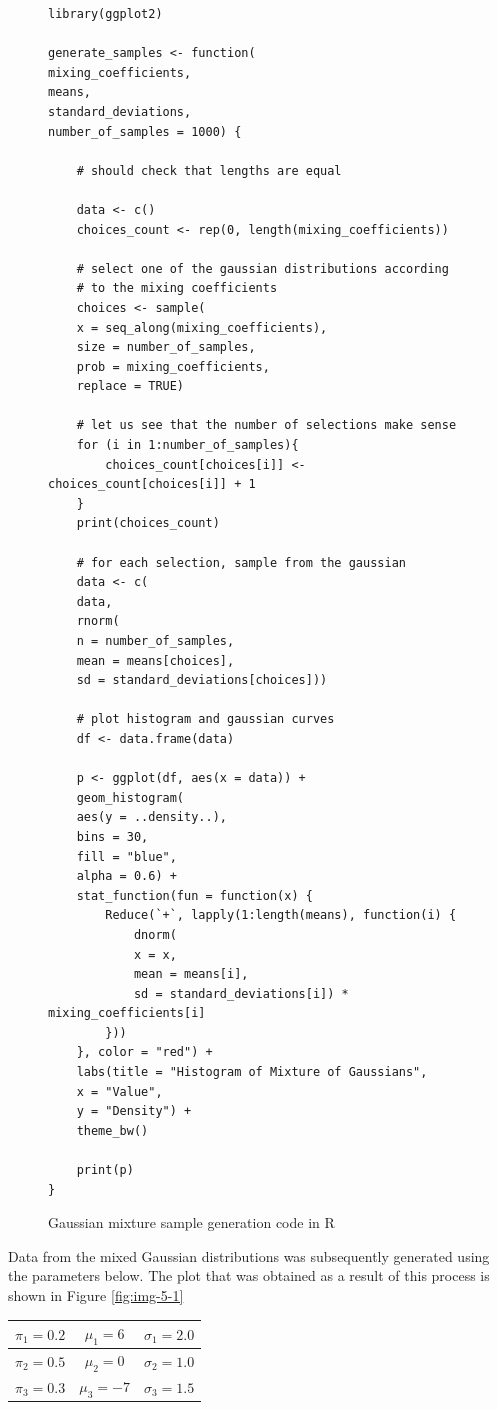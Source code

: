 \documentclass[]{article}
\begin{document}
\begin{figure}[H]
	\captionsetup{type=lstlisting}
	\begin{lstlisting}
library(ggplot2)

generate_samples <- function(
mixing_coefficients,
means,
standard_deviations,
number_of_samples = 1000) {
	
	# should check that lengths are equal
	
	data <- c()
	choices_count <- rep(0, length(mixing_coefficients))
	
	# select one of the gaussian distributions according
	# to the mixing coefficients
	choices <- sample(
	x = seq_along(mixing_coefficients),
	size = number_of_samples,
	prob = mixing_coefficients,
	replace = TRUE)
	
	# let us see that the number of selections make sense
	for (i in 1:number_of_samples){
		choices_count[choices[i]] <- choices_count[choices[i]] + 1
	}
	print(choices_count)
	
	# for each selection, sample from the gaussian
	data <- c(
	data,
	rnorm(
	n = number_of_samples,
	mean = means[choices],
	sd = standard_deviations[choices]))
	
	# plot histogram and gaussian curves
	df <- data.frame(data)
	
	p <- ggplot(df, aes(x = data)) +
	geom_histogram(
	aes(y = ..density..),
	bins = 30,
	fill = "blue",
	alpha = 0.6) +
	stat_function(fun = function(x) {
		Reduce(`+`, lapply(1:length(means), function(i) {
			dnorm(
			x = x,
			mean = means[i],
			sd = standard_deviations[i]) * mixing_coefficients[i]
		}))
	}, color = "red") +
	labs(title = "Histogram of Mixture of Gaussians",
	x = "Value",
	y = "Density") +
	theme_bw()
	
	print(p)
}
	\end{lstlisting}
	\caption{Gaussian mixture sample generation code in R}
	\label{lst:gausmix}
\end{figure}

\noindent Data from the mixed Gaussian distributions was subsequently generated using the parameters below. The plot that was obtained as a result of this process is shown in Figure \ref{fig:img-5-1}

\begin{table}[h]
	\centering
	\renewcommand{\arraystretch}{1.2} %
	\begin{tabular}{|c|c|c|}
		\hline
		$\pi_1 = 0.2$ & $\mu_1 = 6$  & $\sigma_1 = 2.0$  \\
		\hline
		$\pi_2 = 0.5$ & $\mu_2 = 0$  & $\sigma_2 = 1.0$  \\
		\hline
		$\pi_3 = 0.3$ & $\mu_3 = -7$ & $\sigma_3 = 1.5$  \\
		\hline
	\end{tabular}
\end{table}
\end{document}
